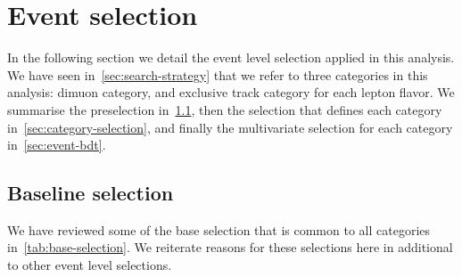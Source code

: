 \clearpage
\section{Event selection}
\label{sec:event-selection}

In the following section we detail the event level selection applied in this analysis. We have seen in~\ref{sec:search-strategy} that we refer to three categories in this analysis: dimuon category, and exclusive track category for each lepton flavor. We summarise the preselection in~\ref{sec:preselection}, then the selection that defines each category in~\ref{sec:category-selection}, and finally the multivariate selection for each category in~\ref{sec:event-bdt}.

\subsection{Baseline selection}
\label{sec:preselection}

We have reviewed some of the base selection that is common to all categories in~\ref{tab:base-selection}. We reiterate reasons for these selections here in additional to other event level selections.

